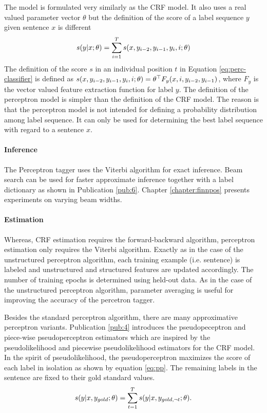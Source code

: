 The model is formulated very similarly as the CRF model. It also uses
a real valued parameter vector $\theta$ but the definition of the score of a label sequence $y$ given sentence $x$ is different 
\begin{equation}s(y|x\mbox{$ ; \, $}\theta) = \sum_{i = 1}^T s(x, y_{i-2},
  y_{i-1}, y_i, i\mbox{$ ; \, $}
  \theta)\label{eq:perc-classifier}\end{equation} The definition of
the score $s$ in an individual position $t$ in Equation
\ref{eq:perc-classifier} is defined as $s(x, y_{i-2}, y_{i-1}, y_i,
i\mbox{$ ; \, $} \theta) = \theta^\top F_y(x, i, y_{i-2}, y_{i-1})$, where
$F_y$ is the vector valued feature extraction function for label
$y$. The definition of the perceptron model is simpler than the
definition of the CRF model. The reason is that the perceptron model
is not intended for defining a probability distribution among label
sequence. It can only be used for determining the best label sequence
with regard to a sentence $x$.

\paragraph{Inference} The Perceptron tagger uses the Viterbi algorithm
for exact inference. Beam search can be used for faster approximate
inference together with a label dictionary as shown in Publication
\ref{pub:6}. Chapter \ref{chapter:finnpos} presents experiments on
varying beam widths.

\paragraph{Estimation}Whereas, CRF estimation requires the
forward-backward algorithm, perceptron estimation only requires the
Viterbi algorithm.  Exactly as in the case of the unstructured perceptron
algorithm, each training example (i.e. sentence) is labeled and
unstructured and structured features are updated accordingly. The
number of training epochs is determined using held-out data. As in the
case of the unstructured perceptron algorithm, parameter averaging is
useful for improving the accuracy of the percetron tagger.

Besides the standard perceptron algorithm, there are many
approximative perceptron variants. Publication \ref{pub:4} introduces
the pseudopeceptron and piece-wise pseudoperceptron estimators which
are inspired by the pseudolikelihood and piecewise pseudolikelihood
estimators for the CRF model. In the spirit of pseudolikelihood, the
pseudoperceptron maximizes the score of each label in isolation as shown by equation \ref{eq:pp}. The
remaining labels in the sentence are fixed to their gold standard
values.
\begin{equation}\label{eq:pp}
s(y|x,y_{gold}\mbox{$ ; \, $}\theta) = \sum_{t=1}^T s(y|x,y_{gold,\neg t}\mbox{$ ; \, $} \theta).
\end{equation}

